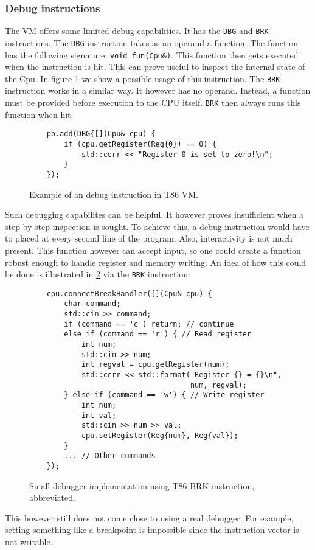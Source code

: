 \subsubsection*{Debug instructions}
The VM offers some limited debug capabilities. It has the \texttt{DBG} and
\texttt{BRK} instructions. The \texttt{DBG} instruction takes as an operand a
function. The function has the following signature: \texttt{void fun(Cpu\&)}.
This function then gets executed when the instruction is hit. This can prove
useful to inspect the internal state of the Cpu. In figure \ref{fig:t86-debug}
we show a possible usage of this instruction. The \texttt{BRK} instruction
works in a similar way. It however has no operand. Instead, a function must be
provided before execution to the CPU itself. \texttt{BRK} then always runs this
function when hit.

\begin{figure}
    \begin{verbatim}
    pb.add(DBG{[](Cpu& cpu) {
        if (cpu.getRegister(Reg{0}) == 0) {
            std::cerr << "Register 0 is set to zero!\n";
        }
    });
    \end{verbatim}
    \caption{Example of an debug instruction in T86 VM.}
    \label{fig:t86-debug}
\end{figure}

Such debugging capabilites can be helpful. It however proves insufficient
when a step by step inspection is sought. To achieve this, a debug instruction
would have to placed at every second line of the program. Also, interactivity is
not much present. This function however can accept input, so one could create a
function robust enough to handle register and memory writing. An idea of how
this could be done is illustrated in \ref{fig:t86-pocket-debugger} via the
\texttt{BRK} instruction.
\begin{figure}
    \begin{verbatim}
    cpu.connectBreakHandler([](Cpu& cpu) {
        char command;
        std::cin >> command;
        if (command == 'c') return; // continue
        else if (command == 'r') { // Read register
            int num;
            std::cin >> num;
            int regval = cpu.getRegister(num);
            std::cerr << std::format("Register {} = {}\n",
                                     num, regval);
        } else if (command == 'w') { // Write register
            int num;
            int val;
            std::cin >> num >> val;
            cpu.setRegister(Reg{num}, Reg{val});
        }
        ... // Other commands
    });
    \end{verbatim}
    \caption{Small debugger implementation using T86 BRK instruction, abbreviated.}
    \label{fig:t86-pocket-debugger}
\end{figure}
This however still does not come close to using a real debugger.
For example, setting something like a breakpoint is impossible since
the instruction vector is not writable.
